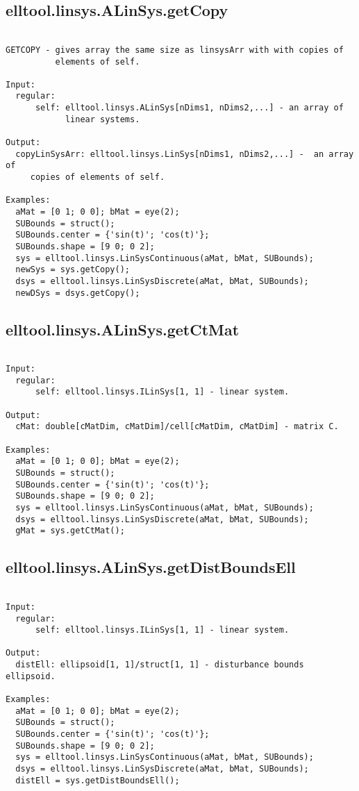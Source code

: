 \subsection{\texorpdfstring{elltool.linsys.ALinSys.getCopy}{getCopy}}\label{method:elltool.linsys.ALinSys.getCopy}
\begin{verbatim}

GETCOPY - gives array the same size as linsysArr with with copies of
          elements of self.

Input:
  regular:
      self: elltool.linsys.ALinSys[nDims1, nDims2,...] - an array of
            linear systems.

Output:
  copyLinSysArr: elltool.linsys.LinSys[nDims1, nDims2,...] -  an array of
     copies of elements of self.

Examples:
  aMat = [0 1; 0 0]; bMat = eye(2);
  SUBounds = struct();
  SUBounds.center = {'sin(t)'; 'cos(t)'};
  SUBounds.shape = [9 0; 0 2];
  sys = elltool.linsys.LinSysContinuous(aMat, bMat, SUBounds);
  newSys = sys.getCopy();
  dsys = elltool.linsys.LinSysDiscrete(aMat, bMat, SUBounds);
  newDSys = dsys.getCopy();
\end{verbatim}
\subsection{\texorpdfstring{elltool.linsys.ALinSys.getCtMat}{getCtMat}}\label{method:elltool.linsys.ALinSys.getCtMat}
\begin{verbatim}

Input:
  regular:
      self: elltool.linsys.ILinSys[1, 1] - linear system.

Output:
  cMat: double[cMatDim, cMatDim]/cell[cMatDim, cMatDim] - matrix C.

Examples:
  aMat = [0 1; 0 0]; bMat = eye(2);
  SUBounds = struct();
  SUBounds.center = {'sin(t)'; 'cos(t)'};
  SUBounds.shape = [9 0; 0 2];
  sys = elltool.linsys.LinSysContinuous(aMat, bMat, SUBounds);
  dsys = elltool.linsys.LinSysDiscrete(aMat, bMat, SUBounds);
  gMat = sys.getCtMat();
\end{verbatim}
\subsection{\texorpdfstring{elltool.linsys.ALinSys.getDistBoundsEll}{getDistBoundsEll}}\label{method:elltool.linsys.ALinSys.getDistBoundsEll}
\begin{verbatim}

Input:
  regular:
      self: elltool.linsys.ILinSys[1, 1] - linear system.

Output:
  distEll: ellipsoid[1, 1]/struct[1, 1] - disturbance bounds ellipsoid.

Examples:
  aMat = [0 1; 0 0]; bMat = eye(2);
  SUBounds = struct();
  SUBounds.center = {'sin(t)'; 'cos(t)'};
  SUBounds.shape = [9 0; 0 2];
  sys = elltool.linsys.LinSysContinuous(aMat, bMat, SUBounds);
  dsys = elltool.linsys.LinSysDiscrete(aMat, bMat, SUBounds);
  distEll = sys.getDistBoundsEll();
\end{verbatim}
